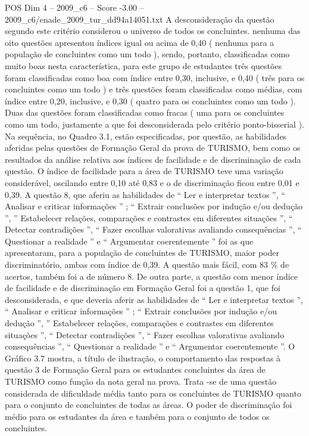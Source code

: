 \begin{textsample}{POS Dim 4 – 2009\_c6 – Score -3.00 – 2009\_c6/enade\_2009\_tur\_dd94a14051.txt}
A desconsideração da questão segundo este critério considerou o universo de todos os concluintes. nenhuma das oito questões apresentou índices igual ou acima de 0,40 ( nenhuma para a população de concluintes como um todo ), sendo, portanto, classificadas como muito boas nesta característica, para este grupo de estudantes três questões foram classificadas como boa com índice entre 0,30, inclusive, e 0,40 ( três para os concluintes como um todo ) e três questões foram classificadas como médias, com índice entre 0,20, inclusive, e 0,30 ( quatro para os concluintes como um todo ).
Duas das questões foram classificadas como fracas ( uma para os concluintes como um todo, justamente a que foi desconsiderada pelo critério ponto-bisserial ).
Na sequência, no Quadro 3.1, estão especificadas, por questão, as habilidades aferidas pelas questões de Formação Geral da prova de TURISMO, bem como os resultados da análise relativa aos índices de facilidade e de discriminação de cada questão.
O índice de facilidade para a área de TURISMO teve uma variação considerável, oscilando entre 0,10 até 0,83 e o de discriminação ficou entre 0,01 e 0,39.
A questão 8, que aferiu as habilidades de “ Ler e interpretar textos ”, “ Analisar e criticar informações ” ; “ Extrair conclusões por indução e/ou dedução ”, ” Estabelecer relações, comparações e contrastes em diferentes situações ”, “ Detectar contradições ”, “ Fazer escolhas valorativas avaliando consequências ”, “ Questionar a realidade ” e “ Argumentar coerentemente ” foi as que apresentaram, para a população de concluintes de TURISMO, maior poder discriminatório, ambas com índice de 0,39.
A questão mais fácil, com 83 \% de acertos, também foi a de número 8.
De outra parte, a questão com menor índice de facilidade e de discriminação em Formação Geral foi a questão 1, que foi desconsiderada, e que deveria aferir as habilidades de “ Ler e interpretar textos ”, “ Analisar e criticar informações ” ; “ Extrair conclusões por indução e/ou dedução ”, ” Estabelecer relações, comparações e contrastes em diferentes situações ”, “ Detectar contradições ”, “ Fazer escolhas valorativas avaliando consequências ”, “ Questionar a realidade ” e “ Argumentar coerentemente ”.
O Gráfico 3.7 mostra, a título de ilustração, o comportamento das respostas à questão 3 de Formação Geral para os estudantes concluintes da área de TURISMO como função da nota geral na prova.
Trata -se de uma questão considerada de dificuldade média tanto para os concluintes de TURISMO quanto para o conjunto de concluintes de todas as áreas.
O poder de discriminação foi médio para os estudantes da área e também para o conjunto de todos os concluintes.

\end{textsample}
